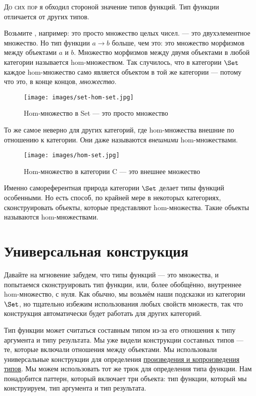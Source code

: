 
\lettrine[lhang=0.17]{Д}{о сих пор} я обходил стороной значение типов функций. Тип функции
отличается от других типов.

Возьмите , например: это просто множество целых чисел.
 --- это двухэлементное множество. Но тип функции
$a\to b$ больше, чем это: это множество морфизмов
между объектами $a$ и $b$. Множество морфизмов между
двумя объектами в любой категории называется hom-множеством. Так случилось, что
в категории $\Set$ каждое hom-множество само является объектом в той же
категории --- потому что это, в конце концов, \emph{множество}.

\begin{figure}[H]
  \centering
  \texttt{[image: images/set-hom-set.jpg]}
  \caption{Hom-множество в Set --- это просто множество}
\end{figure}

\noindent
То же самое неверно для других категорий, где hom-множества внешние по отношению к
категории. Они даже называются \emph{внешними} hom-множествами.

\begin{figure}[H]
  \centering
  \texttt{[image: images/hom-set.jpg]}
  \caption{Hom-множество в категории C --- это внешнее множество}
\end{figure}

\noindent
Именно самореферентная природа категории $\Set$ делает
типы функций особенными. Но есть способ, по крайней мере в некоторых категориях,
сконструировать объекты, которые представляют hom-множества. Такие объекты называются
 hom-множествами.

\section{Универсальная конструкция}

Давайте на мгновение забудем, что типы функций --- это множества, и попытаемся
сконструировать тип функции, или, более обобщённо, внутреннее hom-множество, с
нуля. Как обычно, мы возьмём наши подсказки из категории $\Set$,
но тщательно избежим использования любых свойств множеств, так что
конструкция автоматически будет работать для других категорий.

Тип функции может считаться составным типом из-за его
отношения к типу аргумента и типу результата. Мы уже
видели конструкции составных типов --- те, которые включали
отношения между объектами. Мы использовали универсальные конструкции для определения
\hyperref[products-and-coproducts]{произведения
  и копроизведения типов}. Мы можем использовать тот же трюк для определения
типа функции. Нам понадобится паттерн, который включает три объекта:
тип функции, который мы конструируем, тип аргумента и
тип результата.

